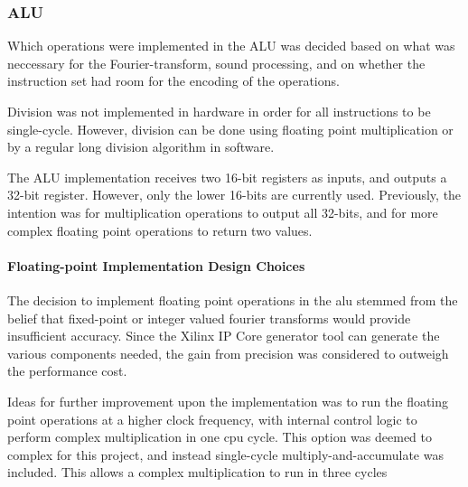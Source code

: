 \FloatBarrier
\subsubsection{ALU}\label{subsec:fpga-alu}

Which operations were implemented in the ALU was decided based on what
was neccessary for the Fourier-transform, sound processing, and on whether the
instruction set had room for the encoding of the operations.

Division was not implemented in hardware in order for all instructions to be
single-cycle. However, division can be done using floating point multiplication
or by a regular long division algorithm in software.

The ALU implementation receives two 16-bit registers as inputs, and outputs a
32-bit register. However, only the lower 16-bits are currently used. Previously,
the intention was for multiplication operations to output all 32-bits, and for 
more complex floating point operations to return two values. 

\paragraph{Floating-point Implementation Design Choices}
The decision to implement floating point operations in the alu stemmed from the
belief that fixed-point or integer valued fourier transforms would provide
insufficient accuracy. Since the Xilinx IP Core generator tool can generate the
various components needed, the gain from precision was considered to outweigh the
performance cost.

Ideas for further improvement upon the implementation was to run the floating
point operations at a higher clock frequency, with internal control logic to
perform complex multiplication in one cpu cycle. This option was deemed to
complex for this project, and instead single-cycle multiply-and-accumulate was 
included. This allows a complex multiplication to run in three cycles \cite{TODO}

%
%

